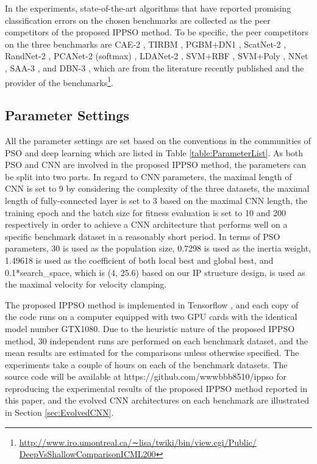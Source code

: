 \documentclass[conference]{IEEEtran}
\begin{document}
In the experiments, state-of-the-art algorithms that have reported promising classification errors on the chosen benchmarks are collected as the peer competitors of the proposed IPPSO method. To be specific, the peer competitors on the three benchmarks are CAE-2 \cite{CAE:Rifai}, TIRBM \cite{TIRBM:Sohn}, PGBM+DN1 \cite{PGBMDN1:Sohn}, ScatNet-2 \cite{ScatteringCNN:Bruna}, RandNet-2 \cite{DLBaseline:Chan}, PCANet-2 (softmax) \cite{DLBaseline:Chan}, LDANet-2 \cite{DLBaseline:Chan}, SVM+RBF \cite{DeepArchitectureEval:Larochelle}, SVM+Poly \cite{DeepArchitectureEval:Larochelle}, NNet \cite{DeepArchitectureEval:Larochelle}, SAA-3 \cite{DeepArchitectureEval:Larochelle}, and DBN-3 \cite{DeepArchitectureEval:Larochelle}, which are from the literature \cite{DLBaseline:Chan} recently published and the provider of the benchmarks\footnote{\url{http://www.iro.umontreal.ca/∼lisa/twiki/bin/view.cgi/Public/ DeepVsShallowComparisonICML200}}. 

\subsection{Parameter Settings}

All the parameter settings are set based on the conventions in the communities of PSO \cite{PSOEPSettings:Van} and deep learning \cite{DLGuide:Hinton} which are listed in Table \ref{table:ParameterList}. As both PSO and CNN are involved in the proposed IPPSO method, the parameters can be split into two parts. In regard to CNN parameters, the maximal length of CNN is set to 9 by considering the complexity of the three datasets, the maximal length of fully-connected layer is set to 3 based on the maximal CNN length, the training epoch and the batch size for fitness evaluation is set to 10 and 200 respectively in order to achieve a CNN architecture that performs well on a specific benchmark dataset in a reasonably short period. In terms of PSO parameters, 30 is used as the population size, 0.7298 is used as the inertia weight, 1.49618 is used as the coefficient of both local best and global best, and 0.1*search\_space, which is (4, 25.6) based on our IP structure design, is used as the maximal velocity for velocity clamping. 

The proposed IPPSO method is implemented in Tensorﬂow \cite{Tensorfow:Abadi}, and each copy of the code runs on a computer equipped with two GPU cards with the identical model number GTX1080. Due to the heuristic nature of the proposed IPPSO method, 30 independent runs are performed on each benchmark dataset, and the mean results are estimated for the comparisons unless otherwise specified. The experiments take a couple of hours on each of the benchmark datasets. The source code will be available at https://github.com/wwwbbb8510/ippso for reproducing the experimental results of the proposed IPPSO method reported in this paper, and the evolved CNN architectures on each benchmark are illustrated in Section \ref{sec:EvolvedCNN}.
\end{document}
